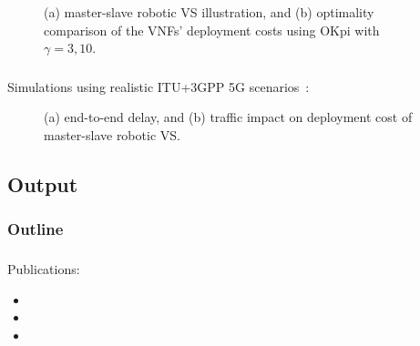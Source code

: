 \documentclass[aspectratio=169]{beamer}
\begin{document}
\begin{frame}
\begin{figure}[ht]
        \caption{(a) master-slave robotic VS illustration, and (b) optimality comparison of the VNFs' deployment costs using OKpi with $\gamma=3,10$.}
        \label{fig:fig}
    \end{figure}
\end{frame}


\begin{frame}
    \frametitle{\secname}
    \framesubtitle{\subsecname}

    Simulations using realistic ITU+3GPP 5G scenarios~\cite{modelling-bs}:
    \begin{figure}[ht]
        \hspace{2em}
        \caption{(a) end-to-end delay, and (b) traffic impact on deployment cost of master-slave robotic VS.}
        \label{fig:increase-results}
    \end{figure}
\end{frame}











\subsection{Output}
\begin{frame}
    \frametitle{Outline}
    \tableofcontents[subsectionstyle=show/shaded/hide,sectionstyle=show/shaded]
\end{frame}


\begin{frame}
    \frametitle{\secname}
    \framesubtitle{\subsecname}
    Publications:
    \begin{itemize}
        \item {}
        \item {}
        \item {}
    \end{itemize}
\end{frame}
\end{document}
